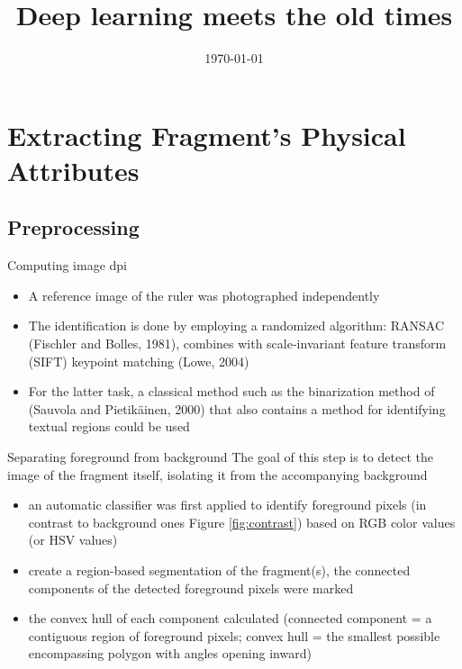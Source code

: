 \documentclass[12pt]{beamer}
\title[LaBRi]{Deep learning meets the old times}
\author[Tu VU]{} %
\institute[LaBRi]{}
\date{\today}
\begin{document}
\begin{frame}
\titlepage
\end{frame}

\section{Extracting Fragment’s Physical Attributes}
\subsection{Preprocessing}
\begin{frame}{Computing image dpi}
\begin{itemize}
\item A reference image of the ruler was photographed independently
\item The identification is done by employing a randomized algorithm: RANSAC
(Fischler and Bolles, 1981), combines with scale-invariant feature transform (SIFT) keypoint matching (Lowe, 2004)
\item For the latter task, a classical method such as the binarization method of (Sauvola and Pietikäinen, 2000) that also contains a method for identifying textual regions could be used
\end{itemize}
\end{frame}

\begin{frame}{Separating foreground from background}
The goal of this step is to detect the image of the fragment itself, isolating it from the accompanying background
\begin{itemize}
\item an automatic classifier was first applied to identify foreground pixels (in contrast to background ones Figure \ref{fig:contrast}) based on RGB color values (or HSV values)
\item create a region-based segmentation of the fragment(s), the connected components of the detected foreground pixels were marked
\item the convex hull of each component calculated (connected component = a contiguous region of foreground pixels; convex hull = the smallest possible encompassing polygon with angles opening inward)
\end{itemize}
\end{frame}
\end{document}
